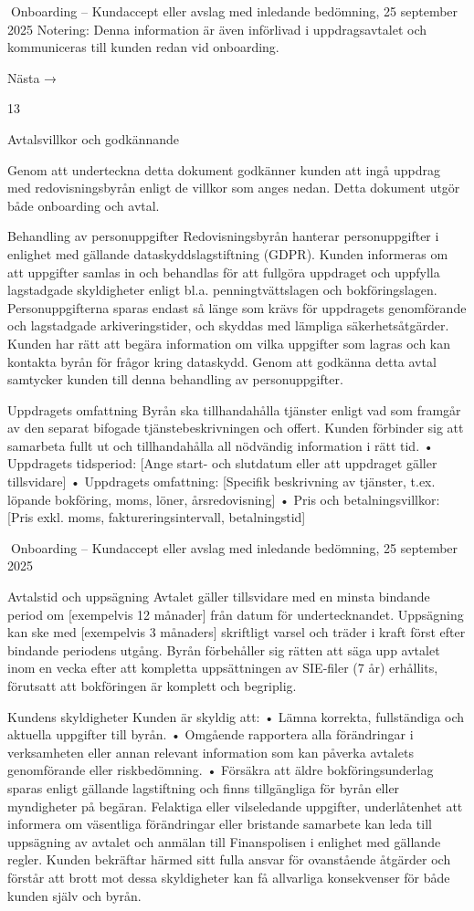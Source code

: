 Onboarding – Kundaccept eller avslag med inledande bedömning,
25 september 2025
Notering:
Denna information är även införlivad i uppdragsavtalet och kommuniceras till kunden redan vid onboarding.

Nästa →

13

Avtalsvillkor och godkännande

Genom att underteckna detta dokument godkänner kunden att ingå uppdrag med redovisningsbyrån enligt de villkor som anges nedan. Detta dokument utgör både onboarding
och avtal.

Behandling av personuppgifter
Redovisningsbyrån hanterar personuppgifter i enlighet med gällande dataskyddslagstiftning (GDPR). Kunden informeras om att uppgifter samlas in och behandlas för att fullgöra uppdraget och uppfylla lagstadgade skyldigheter enligt bl.a. penningtvättslagen och
bokföringslagen.
Personuppgifterna sparas endast så länge som krävs för uppdragets genomförande och
lagstadgade arkiveringstider, och skyddas med lämpliga säkerhetsåtgärder. Kunden har
rätt att begära information om vilka uppgifter som lagras och kan kontakta byrån för
frågor kring dataskydd.
Genom att godkänna detta avtal samtycker kunden till denna behandling av personuppgifter.

Uppdragets omfattning
Byrån ska tillhandahålla tjänster enligt vad som framgår av den separat bifogade tjänstebeskrivningen och offert. Kunden förbinder sig att samarbeta fullt ut och tillhandahålla
all nödvändig information i rätt tid.
• Uppdragets tidsperiod: [Ange start- och slutdatum eller att uppdraget gäller tillsvidare]
• Uppdragets omfattning: [Specifik beskrivning av tjänster, t.ex. löpande bokföring,
moms, löner, årsredovisning]
• Pris och betalningsvillkor: [Pris exkl. moms, faktureringsintervall, betalningstid]

Onboarding – Kundaccept eller avslag med inledande bedömning,
25 september 2025

Avtalstid och uppsägning
Avtalet gäller tillsvidare med en minsta bindande period om [exempelvis 12 månader] från
datum för undertecknandet. Uppsägning kan ske med [exempelvis 3 månaders] skriftligt
varsel och träder i kraft först efter bindande periodens utgång.
Byrån förbehåller sig rätten att säga upp avtalet inom en vecka efter att kompletta
uppsättningen av SIE-filer (7 år) erhållits, förutsatt att bokföringen är komplett och
begriplig.

Kundens skyldigheter
Kunden är skyldig att:
• Lämna korrekta, fullständiga och aktuella uppgifter till byrån.
• Omgående rapportera alla förändringar i verksamheten eller annan relevant information
som kan påverka avtalets genomförande eller riskbedömning.
• Försäkra att äldre bokföringsunderlag sparas enligt gällande lagstiftning och finns tillgängliga för byrån eller myndigheter på begäran.
Felaktiga eller vilseledande uppgifter, underlåtenhet att informera om väsentliga förändringar eller bristande samarbete kan leda till uppsägning av avtalet och anmälan till
Finanspolisen i enlighet med gällande regler.
Kunden bekräftar härmed sitt fulla ansvar för ovanstående åtgärder och förstår att
brott mot dessa skyldigheter kan få allvarliga konsekvenser för både kunden själv och
byrån.

